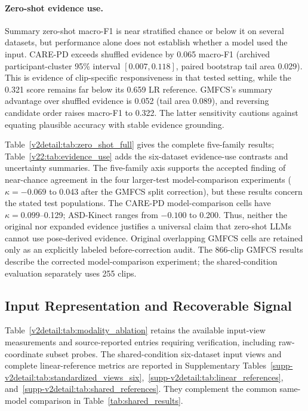 \paragraph{Zero-shot evidence use.}
Summary zero-shot macro-F1 is near stratified chance or below it on several datasets, but performance alone does not establish whether a model used the input. CARE-PD exceeds shuffled evidence by 0.065 macro-F1 (archived participant-cluster 95\% interval $[0.007,0.118]$, paired bootstrap tail area 0.029). This is evidence of clip-specific responsiveness in that tested setting, while the 0.321 score remains far below its 0.659 LR reference. GMFCS's summary advantage over shuffled evidence is 0.052 (tail area 0.089), and reversing candidate order raises macro-F1 to 0.322. The latter sensitivity cautions against equating plausible accuracy with stable evidence grounding.

Table~\ref{v2detail:tab:zero_shot_full} gives the complete five-family results; Table~\ref{v22:tab:evidence_use} adds the six-dataset evidence-use contrasts and uncertainty summaries. The five-family axis supports the accepted finding of near-chance agreement in the four larger-test model-comparison experiments ($\kappa=-0.069$ to 0.043 after the GMFCS split correction), but these results concern the stated test populations. The CARE-PD model-comparison cells have $\kappa=0.099$--0.129; ASD-Kinect ranges from $-0.100$ to 0.200. Thus, neither the original nor expanded evidence justifies a universal claim that zero-shot LLMs cannot use pose-derived evidence. Original overlapping GMFCS cells are retained only as an explicitly labeled before-correction audit. The 866-clip GMFCS results describe the corrected model-comparison experiment; the shared-condition evaluation separately uses 255 clips.

\subsection{Input Representation and Recoverable Signal}
\label{sec:modality}
Table~\ref{v2detail:tab:modality_ablation} retains the available input-view measurements and source-reported entries requiring verification, including raw-coordinate subset probes. The shared-condition six-dataset input views and complete linear-reference metrics are reported in Supplementary Tables~\ref{supp-v2detail:tab:standardized_views_six},~\ref{supp-v2detail:tab:linear_references}, and~\ref{supp-v2detail:tab:shared_references}. They complement the common same-model comparison in Table~\ref{tab:shared_results}.

